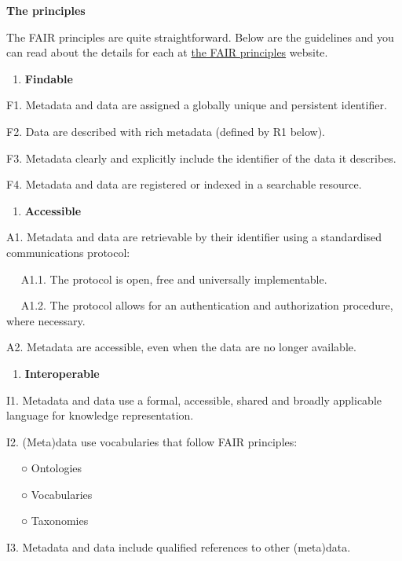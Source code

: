 \documentclass[
]{book}
\providecommand{\tightlist}{%
  \setlength{\itemsep}{0pt}\setlength{\parskip}{0pt}}
\begin{document}
\textbf{The principles}

The FAIR principles are quite straightforward. Below are the guidelines and you can read about the details for each at \href{https://www.go-fair.org/fair-principles/}{the FAIR principles} website.

\begin{enumerate}
\def\labelenumi{\arabic{enumi}.}
\tightlist
\item
  \textbf{Findable}
\end{enumerate}

F1. Metadata and data are assigned a globally unique and persistent identifier.

F2. Data are described with rich metadata (defined by R1 below).

F3. Metadata clearly and explicitly include the identifier of the data it describes.

F4. Metadata and data are registered or indexed in a searchable resource.

\begin{enumerate}
\def\labelenumi{\arabic{enumi}.}
\setcounter{enumi}{1}
\tightlist
\item
  \textbf{Accessible}
\end{enumerate}

A1. Metadata and data are retrievable by their identifier using a standardised communications protocol:

  A1.1. The protocol is open, free and universally implementable.

  A1.2. The protocol allows for an authentication and authorization procedure, where necessary.

A2. Metadata are accessible, even when the data are no longer available.

\begin{enumerate}
\def\labelenumi{\arabic{enumi}.}
\setcounter{enumi}{2}
\tightlist
\item
  \textbf{Interoperable}
\end{enumerate}

I1. Metadata and data use a formal, accessible, shared and broadly applicable language for knowledge representation.

I2. (Meta)data use vocabularies that follow FAIR principles:

  ○ Ontologies

  ○ Vocabularies

  ○ Taxonomies

I3. Metadata and data include qualified references to other (meta)data.
\end{document}
